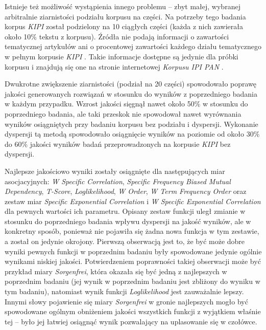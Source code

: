 \documentclass[11pt,a4paper]{llncs}
\begin{document}
\par
Istnieje też możliwość wystąpienia innego problemu -- zbyt małej, wybranej arbitralnie ziarnistości podziału korpusu na części.
Na potrzeby tego badania korpus \emph{KIPI} został podzielony na 10 ciągłych części (każda z nich zawierała około 10\% tekstu z korpusu).
Źródła nie podają informacji o zawartości tematycznej artykułów ani o procentowej zawartości każdego działu tematycznego w pełnym korpusie \emph{KIPI} \cite{korpus_ipi_pan}\cite{korpus_ipi_pan_publikacja}.
Takie informacje dostępne są jedynie dla próbki korpusu i znajdują się one na stronie internetowej \emph{Korpusu IPI PAN} \cite{korpus_ipi_pan}.

\par
Dwukrotne zwiększenie ziarnistości (podział na 20 części) spowodowało poprawę jakości generowanych rozwiązań w stosunku do wyników z poprzedniego badania w każdym przypadku.
Wzrost jakości sięgnął nawet około 50\% w stosunku do poprzedniego badania, ale taki przeskok nie spowodował nawet wyrównania wyników osiągniętych przy badaniu korpusu bez podziału i dyspersji.
Wykonanie dyspersji tą metodą spowodowało osiągnięcie wyników na poziomie od około 30\% do 60\% jakości wyników badań przeprowadzonych na korpusie \emph{KIPI} bez dyspersji.

\par
Najlepsze jakościowo wyniki zostały osiągnięte dla następujących miar asocjacyjnych: \emph{W Specific Correlation}, \emph{Specific Frequency Biased Mutual Dependency}, \emph{T-Score}, \emph{Loglikelihood}, \emph{W Order}, \emph{W Term Frequency Order} oraz zestaw miar \emph{Specific Exponential Correlation} i \emph{W Specific Exponential Correlation} dla pewnych wartości ich parametru.
Opisany zestaw funkcji uległ zmianie w stosunku do poprzedniego badania wpływu dyspersji na jakość wyników, ale w konkretny sposób, ponieważ nie pojawiła się żadna nowa funkcja w tym zestawie, a został on jedynie okrojony.
Pierwszą obserwacją jest to, że być może dobre wyniki pewnych funkcji w poprzednim badaniu były spowodowane jedynie ogólnie wynikami niskiej jakości.
Potwierdzeniem poprawności takiej obserwacji może być przykład miary \emph{Sorgenfrei}, która okazała się być jedną z najlepszych w poprzednim badaniu (jej wynik w poprzednim badaniu jest zbliżony do wyniku w tym badaniu), natomiast wynik funkcji \emph{Loglikelihood} jest zauważalnie lepszy.
Innymi słowy pojawienie się miary \emph{Sorgenfrei} w gronie najlepszych mogło być spowodowane ogólnym obniżeniem jakości wszystkich funkcji z wyjątkiem właśnie tej -- było jej łatwiej osiągnąć wynik pozwalający na uplasowanie się w czołówce.
\end{document}
